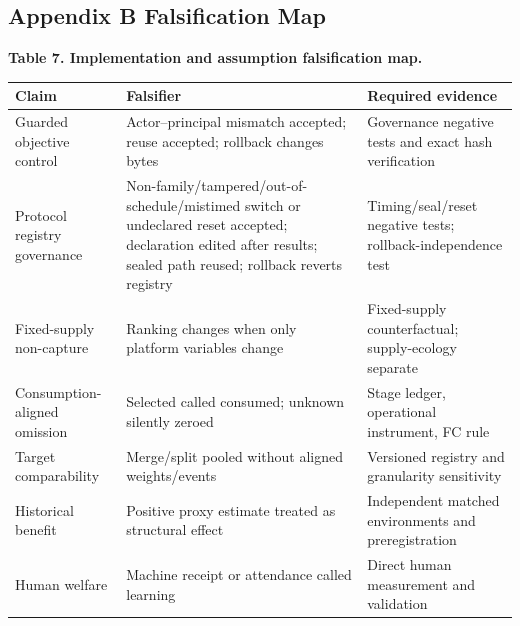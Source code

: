 \documentclass[
  11pt]{article}
\begin{document}
\subsection{Appendix B Falsification
Map}\label{appendix-b-falsification-map}

\textbf{Table 7. Implementation and assumption falsification map.}

\begin{longtable}[]{@{}
  >{\raggedright\arraybackslash}p{}
  >{\raggedright\arraybackslash}p{}
  >{\raggedright\arraybackslash}p{}@{}}
\toprule\noalign{}
\begin{minipage}[b]{\linewidth}\raggedright
Claim
\end{minipage} & \begin{minipage}[b]{\linewidth}\raggedright
Falsifier
\end{minipage} & \begin{minipage}[b]{\linewidth}\raggedright
Required evidence
\end{minipage} \\
\midrule\noalign{}
\endhead
\bottomrule\noalign{}
\endlastfoot
Guarded objective control & Actor--principal mismatch accepted; reuse
accepted; rollback changes bytes & Governance negative tests and exact
hash verification \\
Protocol registry governance &
Non-family/tampered/out-of-schedule/mistimed switch or undeclared reset
accepted; declaration edited after results; sealed path reused; rollback
reverts registry & Timing/seal/reset negative tests;
rollback-independence test \\
Fixed-supply non-capture & Ranking changes when only platform variables
change & Fixed-supply counterfactual; supply-ecology separate \\
Consumption-aligned omission & Selected called consumed; unknown
silently zeroed & Stage ledger, operational instrument, FC rule \\
Target comparability & Merge/split pooled without aligned weights/events
& Versioned registry and granularity sensitivity \\
Historical benefit & Positive proxy estimate treated as structural
effect & Independent matched environments and preregistration \\
Human welfare & Machine receipt or attendance called learning & Direct
human measurement and validation \\
\end{longtable}
\end{document}

